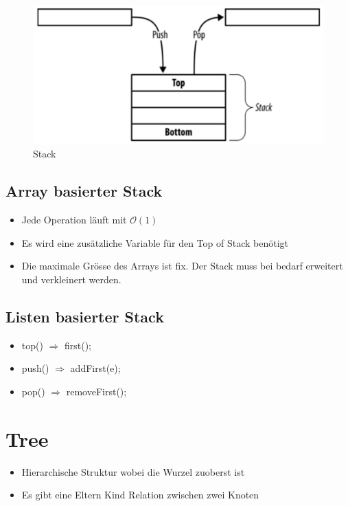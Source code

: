 \begin{figure}[h]
	\centering
	\includegraphics[width=0.5\linewidth]{images/stack.pdf}
	\caption{Stack}
\end{figure}

\subsection{Array basierter Stack}
\begin{itemize}
	\item Jede Operation läuft mit $\mathcal{O}(1)$
	\item Es wird eine zusätzliche Variable für den Top of Stack benötigt
	\item Die maximale Grösse des Arrays ist fix. Der Stack muss bei bedarf erweitert und verkleinert werden.
\end{itemize}

\subsection{Listen basierter Stack}
\begin{itemize}
	\item top() $\Rightarrow$ first();
	\item push() $\Rightarrow$ addFirst(e);
	\item pop() $\Rightarrow$ removeFirst();
\end{itemize}

\section{Tree}
\begin{itemize}
	\item Hierarchische Struktur wobei die Wurzel zuoberst ist
	\item Es gibt eine Eltern Kind Relation zwischen zwei Knoten
\end{itemize}

